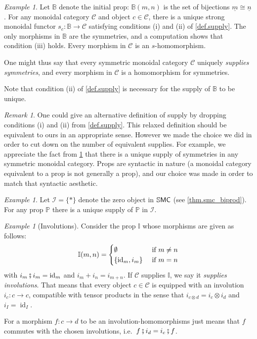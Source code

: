 \documentclass[11pt, oneside, article]{memoir}
\theoremstyle{plain}
\theoremstyle{definition}
\theoremstyle{remark}
\newtheorem{example}[theorem]{Example}
\newtheorem{remark}[theorem]{Remark}
\newcommand{\ord}[1]{\underline{#1}}%
\newcommand{\cat}[1]{\mathcal{#1}}%
\newcommand{\ccat}[1]{\mathbb{#1}}%
\newcommand{\Cat}[1]{{\mathsf{#1}}}%
\newcommand{\CCat}[1]{\mathbb{\StrLeft{#1}{1}}\Cat{\StrGobbleLeft{#1}{1}}}%
\DeclareMathOperator{\id}{id}
\newcommand{\tn}[1]{\textnormal{#1}}
\newcommand{\bij}{\bb}
\newcommand{\ssmc}{\CCat{SMC}}
\renewcommand{\aa}{\mathbb{A}} %
\newcommand{\bb}{\mathbb{B}} %
\newcommand{\pp}{\mathbb{P}}
\newcommand{\zero}{\cat{I}}
\newcommand{\cp}{\mathbin{\fatsemi}}
\begin{document}
\begin{example}\label{ex.supply_ids}
Let $\bij$ denote the initial prop: $\bij(m,n)$ is the set of bijections $\ord{m}\cong\ord{n}$. For any monoidal category $\cat{C}$ and object $c\in\cat{C}$, there is a unique strong monoidal functor $s_c\colon\bij\to\cat{C}$ satisfying conditions (i) and (ii) of \cref{def.supply}. The only morphisms in $\bij$ are the symmetries, and a computation shows that condition (iii) holds. Every morphism in $\cat{C}$ is an $s$-homomorphism. 

One might thus say that every symmetric monoidal category $\cat{C}$ uniquely \emph{supplies symmetries}, and every morphism in $\cat{C}$ is a homomorphism for symmetries.

Note that condition (ii) of \cref{def.supply} is necessary for the supply of $\bij$ to be unique.
\end{example}

\begin{remark}
One could give an alternative definition of supply by dropping conditions (i) and (ii) from \cref{def.supply}. This relaxed definition should be equivalent to ours in an appropriate sense. However we made the choice we did in order to cut down on the number of equivalent supplies. For example, we appreciate the fact from \cref{ex.supply_ids} that there is a unique supply of symmetries in any symmetric monoidal category. Props are syntactic in nature (a monoidal category equivalent to a prop is not generally a prop), and our choice was made in order to match that syntactic aesthetic.
\end{remark}



\begin{example}\label{ex.terminal_supply}
Let $\zero=\{*\}$ denote the zero object in $\ssmc$ (see \cref{thm.smc_biprod}). For any prop $\pp$ there is a unique supply of $\pp$ in $\zero$.
\end{example}

\begin{example}[Involutions]\label{ex.supply_involutions}
Consider the prop $\ccat{I}$ whose morphisms are given as follows:
\[
  \ccat{I}(m,n)=
  \begin{cases}
  	\emptyset&\tn{ if }m\neq n\\
		\{\id_m, i_m\}&\tn{ if }m=n
  \end{cases}
 \]
 with $i_m\cp i_m=\id_m$ and $i_m+i_n=i_{m+n}$. If $\cat{C}$ supplies $\ccat{I}$, we say it \emph{supplies involutions}. That means that every object $c\in\cat{C}$ is equipped with an involution $i_c\colon c\to c$, compatible with tensor products in the sense that $i_{c\otimes d}=i_c\otimes i_d$ and $i_I=\id_I$.
 
For a morphism $f\colon c\to d$ to be an involution-homomorphisms just means that $f$ commutes with the chosen involutions, i.e.\ $f\cp i_d=i_c\cp f$.
\end{example}
\end{document}
